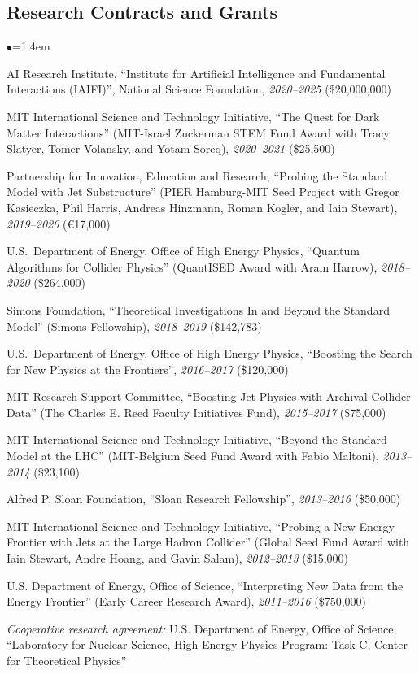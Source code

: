 \documentclass[11pt]{article}
\newcommand{\heading}[1]{\vspace{0in}\subsection*{#1} \vspace{.02in}}
\newcommand{\bbl}{\begin{list}{$\bullet$}{\leftmargin=1.4em \itemsep=-1pt}}
\newcommand{\el}{\end{list}}
\begin{document}
\heading{Research Contracts and Grants}

\bbl

\item AI Research Institute, ``Institute for Artificial Intelligence and Fundamental Interactions (IAIFI)'', National Science Foundation, \textit{2020--2025} (\$20,000,000)
\item MIT International Science and Technology Initiative, ``The Quest for Dark Matter Interactions'' (MIT-Israel Zuckerman STEM Fund Award with Tracy Slatyer, Tomer Volansky, and Yotam Soreq), \textit{2020--2021} (\$25,500)
\item Partnership for Innovation, Education and Research, ``Probing the Standard Model with Jet Substructure'' (PIER Hamburg-MIT Seed Project with Gregor Kasieczka, Phil Harris, Andreas Hinzmann, Roman Kogler, and Iain Stewart), \textit{2019--2020} (\euro{}17,000)
\item U.S.~Department of Energy, Office of High Energy Physics, ``Quantum Algorithms for Collider Physics'' (QuantISED Award with Aram Harrow), \textit{2018--2020} (\$264,000)
\item Simons Foundation, ``Theoretical Investigations In and Beyond the Standard Model'' (Simons Fellowship), \textit{2018--2019} (\$142,783)
\item U.S.~Department of Energy, Office of High Energy Physics, ``Boosting the Search for New Physics at the Frontiers'', \textit{2016--2017} (\$120,000)
\item MIT Research Support Committee, ``Boosting Jet Physics with Archival Collider Data'' (The Charles E. Reed Faculty Initiatives Fund), \textit{2015--2017} (\$75,000)
\item MIT International Science and Technology Initiative, ``Beyond the Standard Model at the LHC'' (MIT-Belgium Seed Fund Award with Fabio Maltoni), \textit{2013--2014} (\$23,100)
\item  Alfred P. Sloan Foundation, ``Sloan Research Fellowship'',  \textit{2013--2016} (\$50,000)
\item MIT International Science and Technology Initiative, ``Probing a New Energy Frontier with Jets at the Large Hadron Collider'' (Global Seed Fund Award with Iain Stewart, Andre Hoang, and Gavin Salam), \textit{2012--2013}  (\$15,000)
\item U.S. Department of Energy, Office of Science, ``Interpreting New Data from the Energy Frontier'' (Early Career Research Award), \textit{2011--2016}  (\$750,000)
\item \textit{Cooperative research agreement:}  U.S. Department of Energy, Office of Science, ``Laboratory for Nuclear Science, High Energy Physics Program:  Task C, Center for Theoretical Physics''
\el
\end{document}
